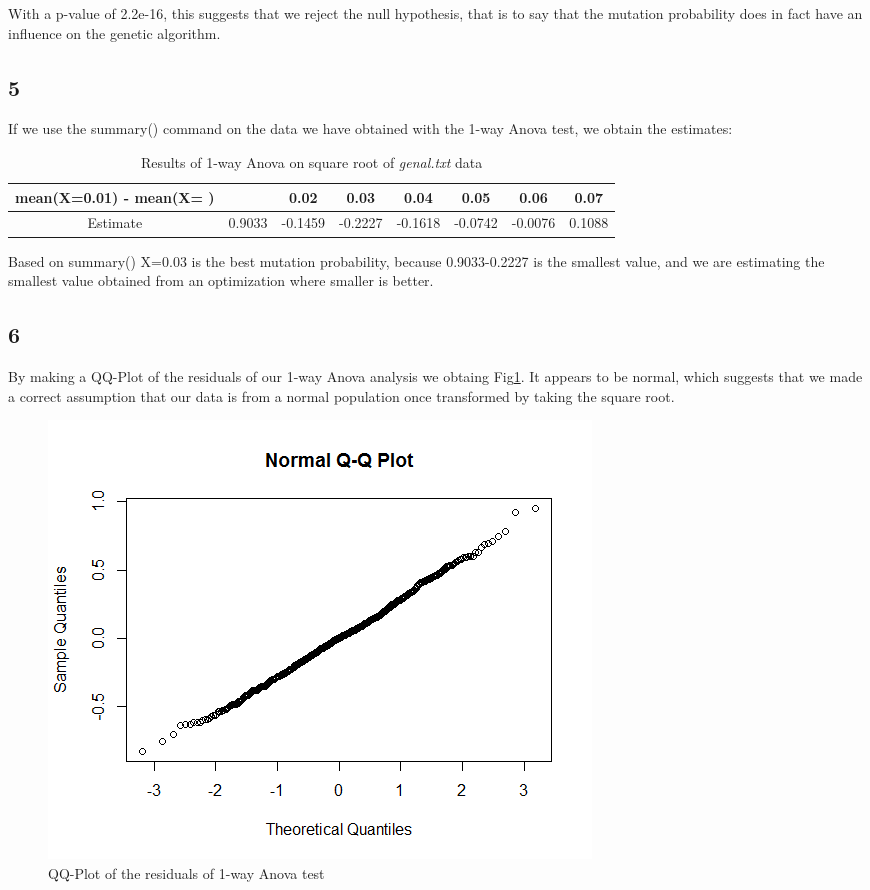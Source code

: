 \documentclass{article}
\begin{document}
    With a p-value of 2.2e-16, this suggests that we reject the null hypothesis, that is to say that the mutation probability does in fact have an influence on the genetic algorithm.
    
    \subsection*{5}
    If we use the summary() command on the data we have obtained with the 1-way Anova test, we obtain the estimates:
    \begin{table}[H]
    \begin{center}
    \begin{tabular}{c|c|c|c|c|c|c|c}
        \hline 
        mean(X=0.01) - mean(X= ) &  & 0.02 & 0.03 & 0.04 & 0.05 & 0.06 & 0.07 \\
        \hline
        Estimate & 0.9033 & -0.1459 & -0.2227 & -0.1618 & -0.0742 & -0.0076 & 0.1088 \\
        \hline
    \end{tabular}
    \caption{Results of 1-way Anova on square root of \textit{genal.txt} data}
    \label{table:1anova}
    \end{center}
    \end{table}
    
    Based on summary() X=0.03 is the best mutation probability, because 0.9033-0.2227 is the smallest value, and we are estimating the smallest value obtained from an optimization where smaller is better.
      
    \subsection*{6}
    By making a QQ-Plot of the residuals of our 1-way Anova analysis we obtaing Fig\ref{fig:qq-resid}. It appears to be normal, which suggests that we made a correct assumption that our data is from a normal population once transformed by taking the square root.
    
    \begin{figure}[H]
    \centering
      \includegraphics[scale=0.4]{../results/3_6.png}
      \caption{QQ-Plot of the residuals of 1-way Anova test}
      \label{fig:qq-resid}
    \end{figure}
    
\end{document}
